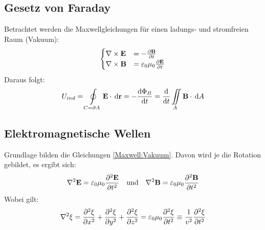 \subsection{Gesetz von Faraday}
Betrachtet werden die Maxwellgleichungen für einen ladungs- und stromfreien Raum (Vakuum):
\begin{equation}\label{Maxwell:Vakuum}
\begin{cases}
\mathbf{\nabla} \times \mathbf{E} &= - \frac{\partial \mathbf{B}}{\partial t} \\
\mathbf{\nabla} \times \mathbf{B} &= \varepsilon_0 \mu_0 \frac{\partial \mathbf{E}}{\partial t}
\end{cases}
\end{equation}
Daraus folgt:
\begin{equation}
U_{ind} = \oint\limits_{C = \partial A} \mathbf{E} \cdot \,\mathrm{d} \mathbf{r} = - \frac{\mathrm d \Phi_B}{\mathrm d t} = \frac{\mathrm d }{\mathrm d t}\iint\limits_A \mathbf{B} \cdot \,\mathrm{d} A
\end{equation}
\subsection{Elektromagnetische Wellen}
Grundlage bilden die Gleichungen \eqref{Maxwell:Vakuum}. Davon wird je die Rotation gebildet, es ergibt sich:
\begin{equation}
\mathbf{\nabla}^2\mathbf{E} = \varepsilon_0 \mu_0 \frac{\partial ^2\mathbf{E}}{\partial t^2} \quad\text{und}\quad \mathbf{\nabla}^2\mathbf{B} = \varepsilon_0 \mu_0 \frac{\partial ^2\mathbf{B}}{\partial t^2}
\end{equation}
Wobei gilt:
\begin{equation}
\mathbf{\nabla}^2\xi = \frac{\partial ^2\xi}{\partial x^2} + \frac{\partial ^2\xi}{\partial y^2} + \frac{\partial ^2\xi}{\partial z^2} = \varepsilon_0 \mu_0 \frac{\partial ^2\xi}{\partial t^2} \equiv \frac{1}{v^2}\frac{\partial ^2\xi}{\partial t^2}
\end{equation}